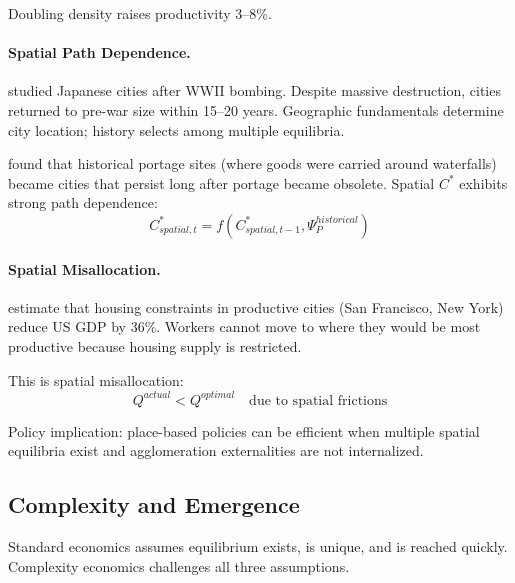 Doubling density raises productivity 3--8\%.

\paragraph{Spatial Path Dependence.}
\citet{davis2002} studied Japanese cities after WWII bombing. Despite massive
destruction, cities returned to pre-war size within 15--20 years. Geographic
fundamentals determine city location; history selects among multiple equilibria.

\citet{bleakley2012} found that historical portage sites (where goods were
carried around waterfalls) became cities that persist long after portage
became obsolete. Spatial $C^*$ exhibits strong path dependence:
\begin{equation}
  C^*_{spatial,t} = f(C^*_{spatial,t-1}, \Psi_P^{historical})
\end{equation}

\paragraph{Spatial Misallocation.}
\citet{hsiehmoretti2019} estimate that housing constraints in productive cities
(San Francisco, New York) reduce US GDP by 36\%. Workers cannot move to where
they would be most productive because housing supply is restricted.

This is spatial misallocation:
\begin{equation}
  Q^{actual} < Q^{optimal} \quad \text{due to spatial frictions}
\end{equation}

Policy implication: place-based policies \citep{klinemoretti2014} can be
efficient when multiple spatial equilibria exist and agglomeration externalities
are not internalized.


\subsection{Complexity and Emergence}

Standard economics assumes equilibrium exists, is unique, and is reached quickly.
Complexity economics \citep{arthur2015} challenges all three assumptions.

